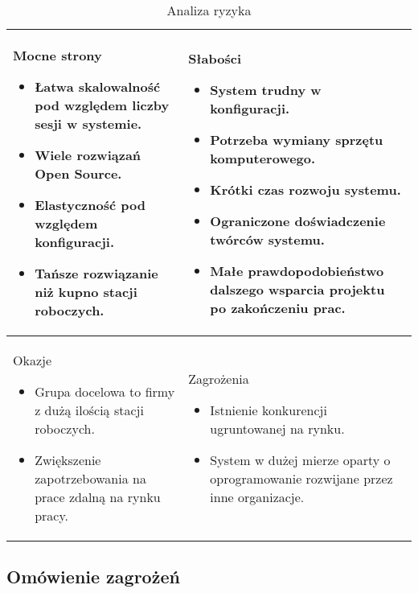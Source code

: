 \documentclass[../wstep.tex]{subfiles}
\begin{document}
\begin{table}[H]
    \caption[Analiza ryzyka]{Analiza ryzyka}
    \label{risk-analysis}
    \centering
    \begin{tabular}{| p{} | p{} |}
        \hline
        Mocne strony
        \begin{itemize}
            \item Łatwa skalowalność pod względem liczby sesji w systemie.
            \item Wiele rozwiązań Open Source.
            \item Elastyczność pod względem konfiguracji.
            \item Tańsze rozwiązanie niż kupno stacji roboczych.
        \end{itemize}
         &
        Słabości
        \begin{itemize}
            \item System trudny w konfiguracji.
            \item Potrzeba wymiany sprzętu komputerowego.
            \item Krótki czas rozwoju systemu.
            \item Ograniczone doświadczenie twórców systemu.
            \item Małe prawdopodobieństwo dalszego wsparcia projektu po zakończeniu prac.
        \end{itemize}
        \\ \hline

        Okazje
        \begin{itemize}
            \item Grupa docelowa to firmy z dużą ilością stacji roboczych.
            \item Zwiększenie zapotrzebowania na prace zdalną na rynku pracy.
        \end{itemize}
         &

        Zagrożenia
        \begin{itemize}
            \item Istnienie konkurencji ugruntowanej na rynku.
            \item System w dużej mierze oparty o oprogramowanie rozwijane przez inne organizacje.
        \end{itemize}
        \\ \hline
    \end{tabular}
\end{table}

\subsection{Omówienie zagrożeń}
\end{document}
